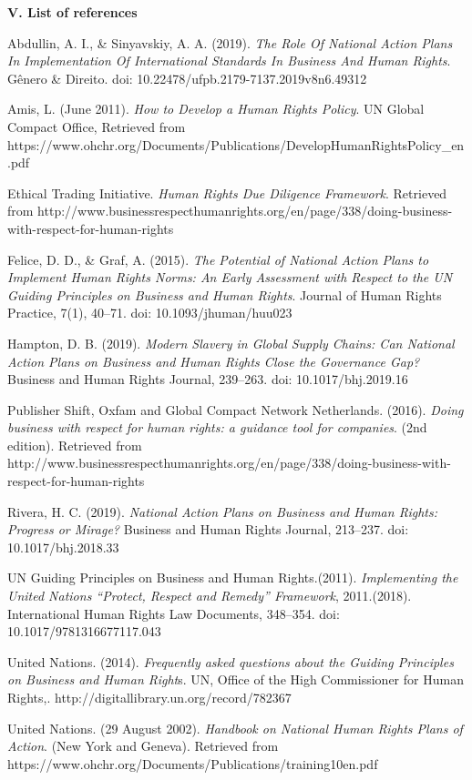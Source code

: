 \thispagestyle{plain}
\textbf{V. List of references}
\begin{flushleft}
		Abdullin, A. I., \& Sinyavskiy, A. A. (2019). \textit{The Role Of National Action Plans In Implementation Of International Standards In Business And Human Rights}. Gênero \& Direito. doi: 10.22478/ufpb.2179-7137.2019v8n6.49312

		Amis, L. (June 2011). \textit{How to Develop a Human Rights Policy}. UN Global Compact Office, Retrieved from https://www.ohchr.org/Documents/Publications/DevelopHumanRightsPolicy\_en.pdf

		Ethical Trading Initiative. \textit{Human Rights Due Diligence Framework}. Retrieved from http://www.businessrespecthumanrights.org/en/page/338/doing-business-with-respect-for-human-rights

		Felice, D. D., \& Graf, A. (2015). \textit{The Potential of National Action Plans to Implement Human Rights Norms: An Early Assessment with Respect to the UN Guiding Principles on Business and Human Rights}. Journal of Human Rights Practice, 7(1), 40–71. doi: 10.1093/jhuman/huu023

		Hampton, D. B. (2019). \textit{Modern Slavery in Global Supply Chains: Can National Action Plans on Business and Human Rights Close the Governance Gap?} Business and Human Rights Journal, 239–263. doi: 10.1017/bhj.2019.16

		Publisher Shift, Oxfam and Global Compact Network Netherlands. (2016). \textit{Doing business with respect for human rights: a guidance tool for companies}. (2nd edition). Retrieved from http://www.businessrespecthumanrights.org/en/page/338/doing-business-with-respect-for-human-rights

		Rivera, H. C. (2019). \textit{National Action Plans on Business and Human Rights: Progress or Mirage?} Business and Human Rights Journal, 213–237. doi: 10.1017/bhj.2018.33

		UN Guiding Principles on Business and Human Rights.(2011). \textit{Implementing the United Nations “Protect, Respect and Remedy” Framework}, 2011.(2018). International Human Rights Law Documents, 348–354. doi: 10.1017/9781316677117.043

		United Nations. (2014). \textit{Frequently asked questions about the Guiding Principles on Business and Human Right}s. UN, Office of the High Commissioner for Human Rights,. http://digitallibrary.un.org/record/782367

		United Nations. (29 August 2002). \textit{Handbook on National Human Rights Plans of Action}. (New York and Geneva). Retrieved from https://www.ohchr.org/Documents/Publications/training10en.pdf
\end{flushleft}

